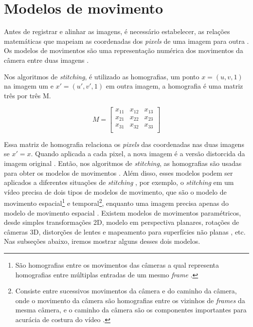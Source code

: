 \documentclass{article}
\begin{document}
\section{Modelos de movimento}
Antes de registrar e alinhar as imagens, é necessário estabelecer, as relações matemáticas que mapeiam as coordenadas dos \textit{pixels} de uma imagem para outra \cite{szeliski:2010}. Os modelos de movimentos são uma representação numérica dos movimentos da câmera entre duas imagens \cite{yoonandlee:2017}. 

Nos algoritmos de \textit{stitching}, é utilizado as homografias, um ponto $x = (u, v, 1)$ na imagem um e $x' = (u', v', 1)$ em outra imagem, a homografia é uma matriz três por três M.

\begin{equation}
M = 
\begin{bmatrix}
x_{11} & x_{12} & x_{13} \\
x_{21} & x_{22} & x_{23}\\
x_{31} & x_{32} & x_{33}\\
\end{bmatrix}
\end{equation}

Essa matriz de homografia relaciona os \textit{pixels} das coordenadas nas duas imagens se $x' = x$. Quando aplicada a cada pixel, a nova imagem é a versão distorcida da imagem original \cite{roth:2014}. Então, nos algoritmos de \textit{stitching}, as homografias são usadas para obter os modelos de movimentos \cite{yoonandlee:2017}. Além disso, esses modelos podem ser aplicados a diferentes situações de \textit{stitching} \cite{szeliski:2010}, por exemplo, o \textit{stitching} em um vídeo precisa de dois tipos de modelos de movimento, que são o modelo de movimento espacial\footnote{São homografias entre os movimentos das câmeras a qual representa homografias entre múltiplas entradas de um mesmo \textit{frame} \cite{yoonandlee:2017}.} e temporal\footnote{Consiste entre sucessivos movimentos da câmera e do caminho da câmera, onde o movimento da câmera são homografias entre os vizinhos de \textit{frames} da mesma câmera, e o caminho da câmera são os componentes importantes para acurácia de costura do vídeo \cite{yoonandlee:2017}.}, enquanto uma imagem precisa apenas do modelo de movimento espacial \cite{yoonandlee:2017}. Existem modelos de movimentos paramétricos, desde simples transformações 2D, modelo em perspectiva planares, rotações de câmeras 3D, distorções de lentes e mapeamento para superfícies não planas \cite{szeliski:2010}, etc. Nas subseções abaixo, iremos mostrar alguns desses dois modelos.
\end{document}
